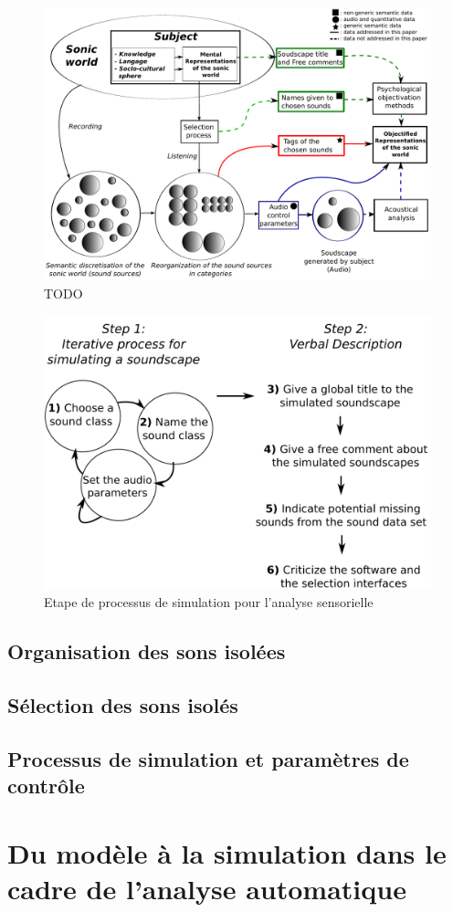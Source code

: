 \begin{figure}[bth]
        \myfloatalign
        \includegraphics[width=.8\linewidth]{gfx/2}
       \caption{TODO}\label{fig:paradigmeSimu2}
\end{figure}

\begin{figure}[bth]
        \myfloatalign
        \includegraphics[width=.8\linewidth]{gfx/4}
       \caption{Etape de processus de simulation pour l'analyse sensorielle}\label{fig:etapeSimu}
\end{figure}


\subsection{Organisation des sons isolées}
\label{db_ui}



\subsection{Sélection des sons isolés}

\subsection{Processus de simulation et paramètres de contrôle}

\section{Du modèle à la simulation dans le cadre de l'analyse automatique}

